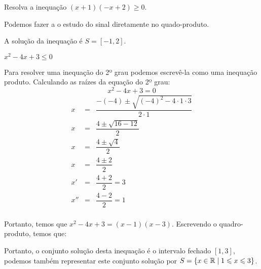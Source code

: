 \begin{exem}
    Resolva a inequação $(x+1)(-x+2)\geq 0$.

    Podemos fazer a o estudo do sinal diretamente no quado-produto.

    \begin{signtbl}{3}{2}
    \end{signtbl}

    A solução da inequação é $S=[-1,2]$.
\end{exem}

\begin{exem}
 $x^2-4x+3 \leqslant 0$
 
Para resolver uma inequação do 2º grau podemos escrevê-la como uma inequação produto. Calculando as raízes da equação do 2º grau:
\begin{equation*}
x^2-4x+3 = 0
\end{equation*}
 \begin{eqnarray*}
 x &=& \dfrac{-(-4) \pm \sqrt{(-4)^2 - 4 \cdot 1 \cdot 3}}{2 \cdot 1} \\
 x &=& \dfrac{4 \pm \sqrt{16 - 12}}{2} \\
 x &=& \dfrac{4 \pm \sqrt{4}}{2} \\
 x &=& \dfrac{4 \pm 2}{2} \\
 x' &=& \dfrac{4 + 2}{2} = 3 \ \\
 x'' &=& \dfrac{4 - 2}{2} = 1 \\
 \end{eqnarray*}
 
 Portanto, temos que $x^2-4x+3= (x-1) (x-3)$. Escrevendo o quadro-produto, temos que:
 \begin{signtbl}{3}{2}
\end{signtbl}
 
 Portanto, o conjunto solução desta inequação é o intervalo fechado $[1, 3]$, podemos também representar este conjunto solução por $S= \left\{ x \in \mathbb{R} \mid 1 \leqslant x \leqslant 3 \right\}$.
 \end{exem}

